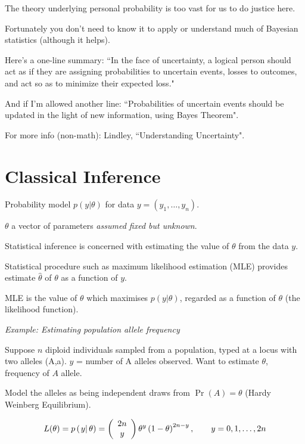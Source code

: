 The theory underlying personal probability is too vast for us to
do justice here.

Fortunately you don't need to know it to apply or understand much of Bayesian statistics
(although it helps).

Here's a one-line summary: ``In the face of uncertainty, a logical person should
act as if they are assigning probabilities to uncertain events, losses to outcomes,
and act so as to minimize their expected loss." 

And if I'm allowed another line: ``Probabilities of uncertain events should be updated in the light
of new information, using Bayes Theorem".

For more info (non-math): Lindley, ``Understanding Uncertainty".



\es\bs


\section*{\hfil Classical Inference\hfil}

Probability model $p\left( {\left. y \right|\theta } \right)$
 for data $y = \left( {y_1 , \ldots ,y_n } \right)$.

$\theta $ a vector of parameters {\em assumed fixed but unknown}.

 Statistical inference is concerned with estimating the value of $\theta $
 from the data $y$.

Statistical procedure such as maximum likelihood estimation (MLE) provides
estimate $\hat \theta$  of $\theta$  as a function of $y$.

MLE is the value of $\theta $ which maximises $p\left( {\left. y
\right|\theta } \right)$, regarded as a function of $\theta $
 (the likelihood function).
    \es \bs

{\em Example: Estimating population allele frequency}  

Suppose $n$ diploid individuals sampled from a population, typed
at a locus with two alleles (A,a). $y$ = number of A alleles observed. Want
to estimate $\theta$, frequency of $A$ allele.

Model the alleles as being independent draws from $\Pr(A) = \theta$ (Hardy Weinberg Equilibrium).

$$L(\theta) = p\left( {\left. y \right|\theta } \right) = \left( {\begin{array}{*{20}c}
   2n  \\
   y  \\
\end{array}} \right)\theta ^y \left( {1 - \theta } \right)^{2n - y}
,\qquad   y = 0, 1,\ldots, 2n$$


